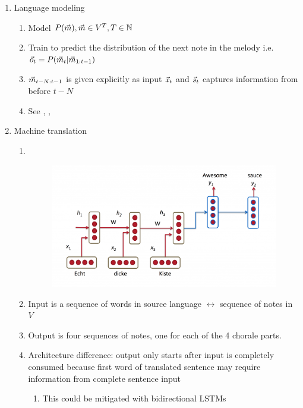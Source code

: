 \documentclass[a4paper,12pt,twoside,openright]{report}
\begin{document}
\begin{enumerate}
    \item Language modeling
        \begin{enumerate}
            \item Model $P(\vec{m}), \vec{m} \in V^T, T \in \mathbb{N}$
            \item Train to predict the distribution of the next note in the
                melody i.e.\ $\vec{o}_t = P(\vec{m}_t | \vec{m}_{1:t-1})$
            \item $\vec{m}_{t-N:t-1}$ is given explicitly as input $\vec{x}_t$ and
                $\vec{s}_{t}$ captures information from before $t-N$
            \item See \cite{Martens2011}, \cite{Mikolov2011}, \cite{Mikolov2010}
        \end{enumerate}
    \item Machine translation
        \begin{enumerate}
            \item~\\
                \begin{figure}[htpb]
                    \centering
                    \includegraphics[width=0.8\linewidth]{Figures/rnn-mt.png}
                    \caption{}
                \end{figure}
            \item Input is a sequence of words in source language $\leftrightarrow$
                sequence of notes in $V$
            \item Output is four sequences of notes, one for each of the 4 chorale parts.
            \item Architecture difference: output only starts after input is completely
                consumed because first word of translated sentence may require information
                from complete sentence input
                \begin{enumerate}
                    \item This could be mitigated with bidirectional LSTMs \cite{Graves2005}

\end{enumerate}
\end{enumerate}
\end{enumerate}
\end{document}
